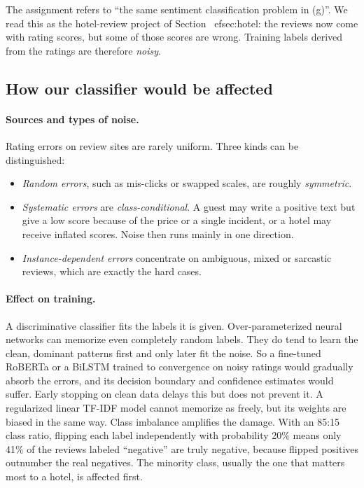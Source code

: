 The assignment refers to ``the same sentiment classification problem in (g)''. We read this as the hotel-review project of Section~
ef{sec:hotel}: the reviews now come with rating scores, but some of those scores are wrong.
Training labels derived from the ratings are therefore \emph{noisy}.

\subsection{How our classifier would be affected}

\paragraph{Sources and types of noise.}
Rating errors on review sites are rarely uniform\cite{song2023learning}. Three kinds can be distinguished:
\begin{itemize}
  \item \emph{Random errors}, such as mis-clicks or swapped scales, are roughly \emph{symmetric}.
  \item \emph{Systematic errors} are \emph{class-conditional}. A guest may write a positive text but give a low score because of the price or a single incident, or a hotel may receive inflated scores. Noise then runs mainly in one direction.
  \item \emph{Instance-dependent errors} concentrate on ambiguous, mixed or sarcastic reviews, which are exactly the hard cases.
\end{itemize}

\paragraph{Effect on training.}
A discriminative classifier fits the labels it is given.
Over-parameterized neural networks can memorize even completely random labels. They do tend to learn the clean, dominant patterns first and only later fit the noise.
So a fine-tuned RoBERTa or a BiLSTM trained to convergence on noisy ratings would gradually absorb the errors, and its decision boundary and confidence estimates would suffer. Early stopping on clean data delays this but does not prevent it.
A regularized linear TF-IDF model cannot memorize as freely, but its weights are biased in the same way.
Class imbalance amplifies the damage. With an 85:15 class ratio, flipping each label independently with probability 20\% means only 41\% of the reviews labeled ``negative'' are truly negative, because flipped positives outnumber the real negatives.
The minority class, usually the one that matters most to a hotel, is affected first.

